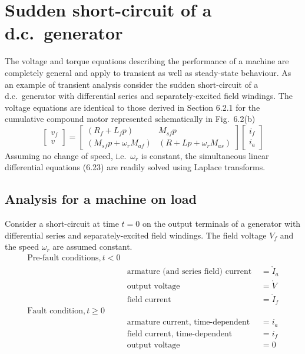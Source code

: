 \documentclass[a4paper,numbers=noenddot,12pt]{scrbook}
\begin{document}
        \section{Sudden short-circuit of a d.c.\ generator}
        The voltage and torque equations describing the performance of a machine are completely general and apply to transient as well as steady-state behaviour. As an example of transient analysis consider the sudden short-circuit of a d.c.\ generator with differential series and separately-excited field windings. The voltage equations are identical to those derived in Section 6.2.1 for the cumulative compound motor represented schematically in Fig.\ 6.2(b)
        \begin{equation}
            \begin{bmatrix}
                v_f \\[2ex] v
            \end{bmatrix} =
            \begin{bmatrix}
                (R_f + L_f p) & M_{sf} p \\[2ex]
                (M_{sf} p + \omega_r M_{af}) & (R + L p + \omega_r M_{as})
            \end{bmatrix}
            \begin{bmatrix}
                i_f \\[2ex] i_a
            \end{bmatrix}
            \label{}
        \end{equation}
        Assuming no change of speed, i.e.\ $\omega_r$ is constant, the simultaneous linear differential equations (6.23) are readily solved using Laplace transforms.

        \subsection{Analysis for a machine on load}
        Consider a short-circuit at time $t=0$ on the output terminals of a generator with differential series and separately-excited field windings. The field voltage $V_f$ and the speed $\omega_r$ are assumed constant.
        \begin{align*}
            \text{Pre-fault conditions}, t < 0\\
            & \text{armature (and series field) current } &= \mathring{I}_a\\
            & \text{output voltage} & = \mathring{V}\\
            & \text{field current} & = \mathring{I}_f\\
            \text{Fault condition}, t \geq 0 \\
            & \text{armature current, time-dependent} & = i_a\\
            & \text{field current, time-dependent} & = i_f \\
            & \text{output voltage} & = 0
        \end{align*}
\end{document}
